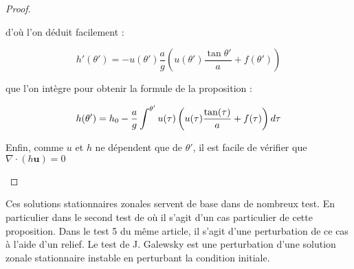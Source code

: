 \begin{proof}
\begin{itemize}
d'où l'on déduit facilement :

\begin{equation}
h'(\theta') = - u(\theta') \dfrac{a}{g} \left( u(\theta') \dfrac{\tan \theta'}{a} + f(\theta') \right)
\end{equation}

que l'on intègre pour obtenir la formule de la proposition :

\begin{equation}
h(\theta') = h_0 - \dfrac{a}{g} \displaystyle\int^{\theta'} u(\tau) \left( u(\tau) \dfrac{\tan (\tau)}{a} + f(\tau) \right) d\tau
\end{equation}

Enfin, comme $u$ et $h$ ne dépendent que de $\theta'$, il est facile de vérifier que $\nabla \cdot \left( h \mathbf{u} \right)=0$
\end{itemize}
\end{proof}

Ces solutions stationnaires zonales servent de base dans de nombreux test. En particulier dans le second test de \cite{Williamson1992} où il s'agit d'un cas particulier de cette proposition. Dans le test 5 du même article, il s'agit d'une perturbation de ce cas à l'aide d'un relief.
Le test de J. Galewsky \cite{Galewsky2004} est une perturbation d'une solution zonale stationnaire instable en perturbant la condition initiale.



